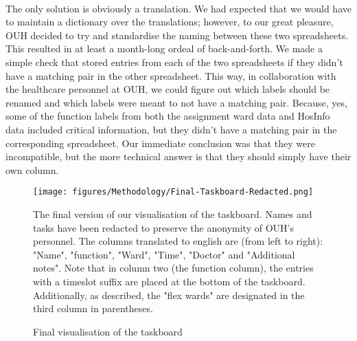 \\
The only solution is obviously a translation. We had expected that we would have to maintain a \gls{dictionary} over the translations; however, to our great pleasure, OUH decided to try and standardise the naming between these two spreadsheets.
\\
This resulted in at least a month-long ordeal of back-and-forth. We made a simple check that stored entries from each of the two spreadsheets if they didn't have a matching pair in the other spreadsheet. This way, in collaboration with the healthcare personnel at OUH, we could figure out which labels should be renamed and which labels were meant to not have a matching pair. Because, yes, some of the \gls{function} labels from both the assignment ward data and HosInfo data included critical information, but they didn't have a matching pair in the corresponding spreadsheet. Our immediate conclusion was that they were incompatible, but the more technical answer is that they should simply have their own column.

\begin{figure}[H]
    \centering
    \texttt{[image: figures/Methodology/Final-Taskboard-Redacted.png]}
    \caption{Final visualisation of the taskboard}
    \small
    \raggedright 
    The final version of our visualisation of the taskboard. Names and tasks have been redacted to preserve the anonymity of OUH's personnel. The columns translated to english are (from left to right): "Name", "\Gls{function}", "Ward", "Time", "Doctor" and "Additional notes". Note that in column two (the \Gls{function} column), the entries with a timeslot suffix are placed at the bottom of the taskboard. Additionally, as described, the "flex wards" are designated in the third column in parentheses.
    \label{fig:Final-Taskboard}
\end{figure}

